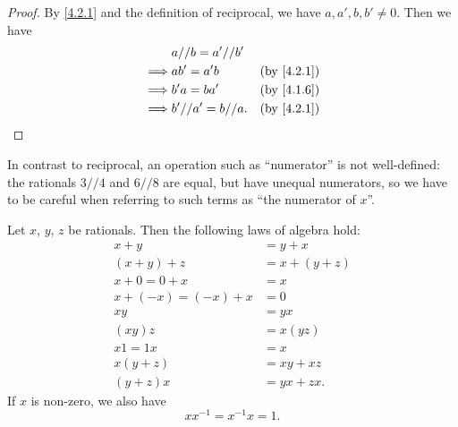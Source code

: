 \begin{proof}
  By \cref{4.2.1} and the definition of reciprocal, we have \(a, a', b, b' \neq 0\).
  Then we have
  \begin{align*}
             & a // b = a' // b'                             \\
    \implies & ab' = a'b          & \text{(by \cref{4.2.1})} \\
    \implies & b'a = ba'          & \text{(by \cref{4.1.6})} \\
    \implies & b' // a' = b // a. & \text{(by \cref{4.2.1})}
  \end{align*}
\end{proof}

\begin{note}
  In contrast to reciprocal, an operation such as ``numerator'' is not well-defined:
  the rationals \(3 // 4\) and \(6 // 8\) are equal, but have unequal numerators, so we have to be careful when referring to such terms as ``the numerator of \(x\)''.
\end{note}

\begin{proposition}\label{4.2.4}
  Let \(x\), \(y\), \(z\) be rationals.
  Then the following laws of algebra hold:
  \begin{align*}
    x + y               & = y + x       \\
    (x + y) + z         & = x + (y + z) \\
    x + 0 = 0 + x       & = x           \\
    x + (-x) = (-x) + x & = 0           \\
    xy                  & = yx          \\
    (xy)z               & = x(yz)       \\
    x1 = 1x             & = x           \\
    x(y + z)            & = xy + xz     \\
    (y + z)x            & = yx + zx.
  \end{align*}
  If \(x\) is non-zero, we also have
  \[
    xx^{-1} = x^{-1}x = 1.
  \]
\end{proposition}

